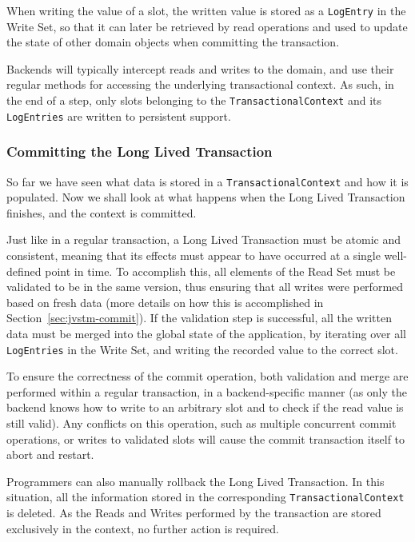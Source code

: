 \documentclass{llncs}
\begin{document}
When writing the value of a slot, the written value is stored as a
\texttt{LogEntry} in the Write Set, so that it can later be retrieved
by read operations and used to update the state of other domain
objects when committing the transaction.

Backends will typically intercept reads and writes to the domain, and
use their regular methods for accessing the underlying transactional
context. As such, in the end of a step, only slots belonging to the
\texttt{TransactionalContext} and its \texttt{LogEntries} are written
to persistent support.

\subsubsection{Committing the Long Lived Transaction}

So far we have seen what data is stored in a
\texttt{TransactionalContext} and how it is populated. Now we shall
look at what happens when the Long Lived Transaction finishes, and the
context is committed.

Just like in a regular transaction, a Long Lived Transaction must be
atomic and consistent, meaning that its effects must appear to have
occurred at a single well-defined point in time. To accomplish this,
all elements of the Read Set must be validated to be in the same
version, thus ensuring that all writes were performed based on fresh
data (more details on how this is accomplished in
Section~\ref{sec:jvstm-commit}). If the validation step is successful,
all the written data must be merged into the global state of the
application, by iterating over all \texttt{LogEntries} in the Write
Set, and writing the recorded value to the correct slot.

To ensure the correctness of the commit operation, both validation and
merge are performed within a regular transaction, in a
backend-specific manner (as only the backend knows how to write to an
arbitrary slot and to check if the read value is still valid). Any
conflicts on this operation, such as multiple concurrent commit
operations, or writes to validated slots will cause the commit
transaction itself to abort and restart.

Programmers can also manually rollback the Long Lived Transaction. In
this situation, all the information stored in the corresponding
\texttt{TransactionalContext} is deleted. As the Reads and Writes
performed by the transaction are stored exclusively in the context, no
further action is required.
\end{document}
